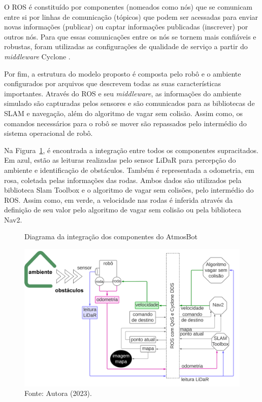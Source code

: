 O ROS é constituído por componentes (nomeados como nós) que se comunicam entre si por linhas de comunicação (tópicos) que podem ser acessadas para enviar novas informações (publicar) ou captar informações publicadas (inscrever) por outros nós. Para que essas comunicações entre os nós se tornem mais confiáveis e robustas, foram utilizadas as configurações de qualidade de serviço  a partir do \textit{middleware} Cyclone \cite{qos, cyclone}.

Por fim, a estrutura do modelo proposto é composta pelo robô e o ambiente configurados por arquivos que descrevem todas as suas características importantes. Através do ROS e seu \textit{middleware}, as informações do ambiente simulado são capturadas pelos sensores e são comunicados para as bibliotecas de SLAM e navegação, além do algoritmo de vagar sem colisão. Assim como, os comandos necessários para o robô se mover são repassados pelo intermédio do sistema operacional de robô.

Na Figura~\ref{fig:diagramaBlocosDetalhado}, é encontrada a integração entre todos os componentes supracitados. Em azul, estão as leituras realizadas pelo sensor LiDaR para percepção do ambiente e identificação de obstáculos. Também é representada a odometria, em rosa, coletada pelas informações das rodas. Ambos dados são utilizados pela biblioteca Slam Toolbox e o algoritmo de vagar sem colisões, pelo intermédio do ROS. Assim como, em verde, a velocidade nas rodas é inferida através da definição de seu valor pelo algoritmo de vagar sem colisão ou pela biblioteca Nav2.

\begin{figure}
    \centering
    \caption{Diagrama da integração dos componentes do AtmosBot}
    \includegraphics[width=\textheight,height=\textwidth,keepaspectratio]{diagramaBlocosDetalhado.png}
    \caption*{Fonte: Autora (2023).}
    \label{fig:diagramaBlocosDetalhado}
\end{figure}

\newpage
